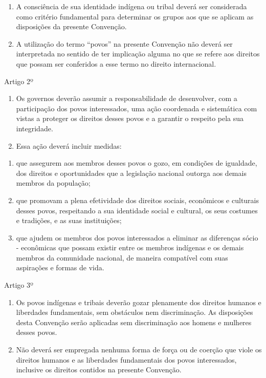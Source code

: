 \documentclass[
]{book}
\begin{document}
\begin{enumerate}
\def\labelenumi{\arabic{enumi}.}
\setcounter{enumi}{1}
\item
  A consciência de sua identidade indígena ou tribal deverá ser considerada como critério fundamental para determinar os grupos aos que se aplicam as disposições da presente Convenção.
\item
  A utilização do termo ``povos'' na presente Convenção não deverá ser interpretada no sentido de ter implicação alguma no que se refere aos direitos que possam ser conferidos a esse termo no direito internacional.
\end{enumerate}

Artigo 2º

\begin{enumerate}
\def\labelenumi{\arabic{enumi}.}
\item
  Os governos deverão assumir a responsabilidade de desenvolver, com a participação dos povos interessados, uma ação coordenada e sistemática com vistas a proteger os direitos desses povos e a garantir o respeito pela sua integridade.
\item
  Essa ação deverá incluir medidas:
\end{enumerate}

\begin{enumerate}
\def\labelenumi{\alph{enumi})}
\item
  que assegurem aos membros desses povos o gozo, em condições de igualdade, dos direitos e oportunidades que a legislação nacional outorga aos demais membros da população;
\item
  que promovam a plena efetividade dos direitos sociais, econômicos e culturais desses povos, respeitando a sua identidade social e cultural, os seus costumes e tradições, e as suas instituições;
\item
  que ajudem os membros dos povos interessados a eliminar as diferenças sócio - econômicas que possam existir entre os membros indígenas e os demais membros da comunidade nacional, de maneira compatível com suas aspirações e formas de vida.
\end{enumerate}

Artigo 3º

\begin{enumerate}
\def\labelenumi{\arabic{enumi}.}
\item
  Os povos indígenas e tribais deverão gozar plenamente dos direitos humanos e liberdades fundamentais, sem obstáculos nem discriminação. As disposições desta Convenção serão aplicadas sem discriminação aos homens e mulheres desses povos.
\item
  Não deverá ser empregada nenhuma forma de força ou de coerção que viole os direitos humanos e as liberdades fundamentais dos povos interessados, inclusive os direitos contidos na presente Convenção.
\end{enumerate}
\end{document}
